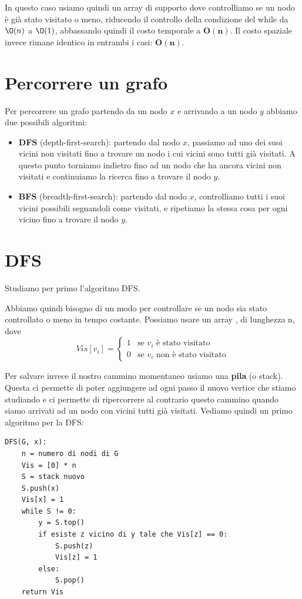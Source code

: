 \documentclass[11pt, a4paper, titlepage, oneside]{scrbook}
\begin{document}
In questo caso usiamo quindi un array di supporto dove controlliamo se un nodo è già stato visitato o meno, riducendo il controllo della condizione del while da $\O(n)$ a $\O(1)$, abbassando quindi il costo temporale a $\textbf{O}\bm{(n)}$. Il costo spaziale invece rimane identico in entrambi i casi: $\textbf{O}\bm{(n)}$.

\section{Percorrere un grafo}

Per percorrere un grafo partendo da un nodo $x$ e arrivando a un nodo $y$ abbiamo due possibili algoritmi:
\begin{itemize}
    \item \textbf{DFS} (depth-first-search): partendo dal nodo $x$, passiamo ad uno dei suoi vicini non visitati fino a trovare un nodo i cui vicini sono tutti già visitati. A questo punto torniamo indietro fino ad un nodo che ha ancora vicini non visitati e continuiamo la ricerca fino a trovare il nodo $y$.
    \item \textbf{BFS} (breadth-first-search): partendo dal nodo $x$, controlliamo tutti i suoi vicini possibili segnandoli come visitati, e ripetiamo la stessa cosa per ogni vicino fino a trovare il nodo $y$. 
\end{itemize}

\section{DFS}

Studiamo per primo l'algoritmo DFS.

Abbiamo quindi bisogno di un modo per controllare se un nodo sia stato controllato o meno in tempo costante. Possiamo usare un array , di lunghezza n, dove
\[
Vis[v_i] =
\begin{cases}
1 & \text{se }v_i \text{ è stato visitato}\\
0 & \text{se }v_i \text{ non è stato visitato}
\end{cases}
\]

Per salvare invece il nostro cammino momentaneo usiamo una \textbf{pila} (o stack). Questa ci permette di poter aggiungere ad ogni passo il nuovo vertice che stiamo studiando e ci permette di ripercorrere al contrario questo cammino quando siamo arrivati ad un nodo con vicini tutti già visitati. Vediamo quindi un primo algoritmo per la DFS:
\begin{lstlisting}[style=Python]
DFS(G, x):
    n = numero di nodi di G
    Vis = [0] * n
    S = stack nuovo
    S.push(x)
    Vis[x] = 1
    while S != 0:
        y = S.top()
        if esiste z vicino di y tale che Vis[z] == 0:
            S.push(z)
            Vis[z] = 1
        else:
            S.pop()
    return Vis
\end{lstlisting}
\end{document}
